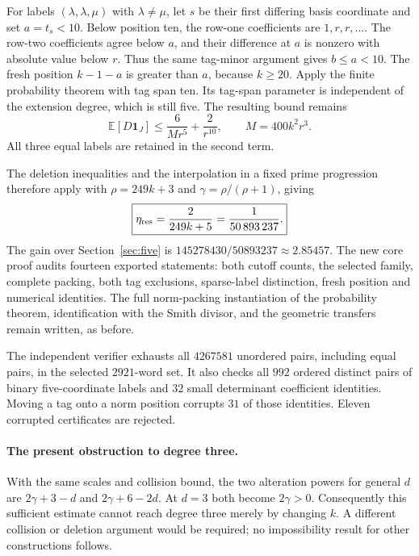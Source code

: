 \documentclass[11pt]{article}
\begin{document}
For labels $(\lambda,\lambda,\mu)$ with $\lambda\ne\mu$, let $s$ be their
first differing basis coordinate and set $a=t_s<10$. Below position ten,
the row-one coefficients are $1,r,r,\ldots$. The row-two coefficients agree
below $a$, and their difference at $a$ is nonzero with absolute value below
$r$. Thus the same tag-minor argument gives $b\le a<10$.
The fresh position $k-1-a$ is greater than $a$, because $k\ge20$.
Apply the finite probability theorem with tag span ten. Its tag-span
parameter is independent of the extension degree, which is still five.
The resulting bound remains
\[
 \mathbb E[D\mathbf1_J]\le \frac6{Mr^5}+\frac2{r^{10}},
 \qquad M=400k^2r^3.
\]
All three equal labels are retained in the second term.

The deletion inequalities and the interpolation in a fixed prime progression
therefore apply with $\rho=249k+3$ and $\gamma=\rho/(\rho+1)$, giving
\[
 \boxed{\eta_{\rm res}=\frac2{249k+5}
       =\frac1{50\,893\,237}.}
\]
The gain over Section~\ref{sec:five} is
$145278430/50893237\approx2.85457$.
The new core proof audits fourteen exported statements: both cutoff counts,
the selected family, complete packing, both tag exclusions, sparse-label
distinction, fresh position and numerical identities. The full norm-packing
instantiation of the probability theorem, identification with the Smith
divisor, and the geometric transfers remain written, as before.

The independent verifier exhausts all $4267581$ unordered pairs, including
equal pairs, in the selected $2921$-word set. It also checks all $992$
ordered distinct pairs of binary five-coordinate labels and $32$ small
determinant coefficient identities. Moving a tag onto a norm position
corrupts $31$ of those identities. Eleven corrupted certificates are rejected.

\paragraph{The present obstruction to degree three.}
With the same scales and collision bound, the two alteration powers for
general $d$ are $2\gamma+3-d$ and $2\gamma+6-2d$. At $d=3$ both become
$2\gamma>0$. Consequently this sufficient estimate cannot reach degree
three merely by changing $k$. A different collision or deletion argument
would be required; no impossibility result for other constructions follows.
\end{document}
